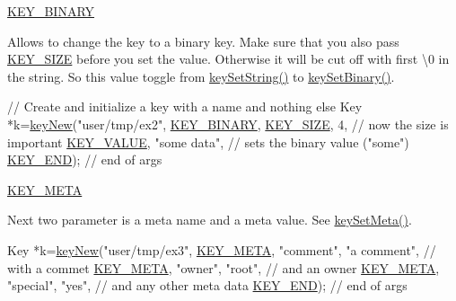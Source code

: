 \begin{DoxyItemize}
\item \hyperlink{group__key_gga91fb3178848bd682000958089abbaf40a1ca18d4e094ae7487d35ecedda2235ff}{K\-E\-Y\-\_\-\-B\-I\-N\-A\-R\-Y} \par
 Allows to change the key to a binary key. Make sure that you also pass \hyperlink{group__key_gga91fb3178848bd682000958089abbaf40a6d531b5c41445d19d0452eebdccbfa01}{K\-E\-Y\-\_\-\-S\-I\-Z\-E} before you set the value. Otherwise it will be cut off with first \textbackslash{}0 in the string. So this value toggle from \hyperlink{group__keyvalue_ga622bde1eb0e0c4994728331326340ef2}{key\-Set\-String()} to \hyperlink{group__keyvalue_gaa50a5358fd328d373a45f395fa1b99e7}{key\-Set\-Binary()}. 
\begin{DoxyCodeInclude}
\textcolor{comment}{// Create and initialize a key with a name and nothing else}
Key *k=\hyperlink{group__key_gad23c65b44bf48d773759e1f9a4d43b89}{keyNew}(\textcolor{stringliteral}{"user/tmp/ex2"},
        \hyperlink{group__key_gga91fb3178848bd682000958089abbaf40a1ca18d4e094ae7487d35ecedda2235ff}{KEY\_BINARY},
        \hyperlink{group__key_gga91fb3178848bd682000958089abbaf40a6d531b5c41445d19d0452eebdccbfa01}{KEY\_SIZE}, 4,               \textcolor{comment}{// now the size is important}
        \hyperlink{group__key_gga91fb3178848bd682000958089abbaf40ac66e4a49d09212b79f5754ca6db5bd2e}{KEY\_VALUE}, \textcolor{stringliteral}{"some data"},    \textcolor{comment}{// sets the binary value ("some")}
        \hyperlink{group__key_gga91fb3178848bd682000958089abbaf40aa8adb6fcb92dec58fb19410eacfdd403}{KEY\_END});                  \textcolor{comment}{// end of args}
\end{DoxyCodeInclude}

\item \hyperlink{group__key_gga91fb3178848bd682000958089abbaf40a040582834bb2d90049947d7ef74e87e2}{K\-E\-Y\-\_\-\-M\-E\-T\-A} \par
 Next two parameter is a meta name and a meta value. See \hyperlink{group__keymeta_gae1f15546b234ffb6007d8a31178652b9}{key\-Set\-Meta()}. 
\begin{DoxyCodeInclude}
Key *k=\hyperlink{group__key_gad23c65b44bf48d773759e1f9a4d43b89}{keyNew}(\textcolor{stringliteral}{"user/tmp/ex3"},
        \hyperlink{group__key_gga91fb3178848bd682000958089abbaf40a040582834bb2d90049947d7ef74e87e2}{KEY\_META}, \textcolor{stringliteral}{"comment"}, \textcolor{stringliteral}{"a comment"},  \textcolor{comment}{// with a commet}
        \hyperlink{group__key_gga91fb3178848bd682000958089abbaf40a040582834bb2d90049947d7ef74e87e2}{KEY\_META}, \textcolor{stringliteral}{"owner"}, \textcolor{stringliteral}{"root"},         \textcolor{comment}{// and an owner}
        \hyperlink{group__key_gga91fb3178848bd682000958089abbaf40a040582834bb2d90049947d7ef74e87e2}{KEY\_META}, \textcolor{stringliteral}{"special"}, \textcolor{stringliteral}{"yes"},        \textcolor{comment}{// and any other meta data}
        \hyperlink{group__key_gga91fb3178848bd682000958089abbaf40aa8adb6fcb92dec58fb19410eacfdd403}{KEY\_END});                  \textcolor{comment}{// end of args}
\end{DoxyCodeInclude}


\end{DoxyItemize}
